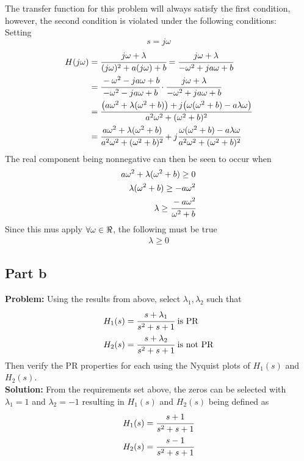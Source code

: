 \documentclass[letter]{article}
\begin{document}
The transfer function for this problem will always satisfy the first condition, however, the second condition is violated under the following conditions:\\
Setting $$s = j\omega$$
\begin{align}
	H(j\omega) &= \cfrac{j\omega + \lambda}{(j\omega)^2 + a (j\omega) + b}
	= \cfrac{j\omega + \lambda}{-\omega^2 + j a \omega + b}\\
	&= \cfrac{-\omega^2 - j a \omega + b}{-\omega^2 - j a \omega + b} \cdot \cfrac{j\omega + \lambda}{-\omega^2 + j a \omega + b}\\
	&= \cfrac{\qty(a \omega^2 + \lambda (\omega^2 + b)) + j \qty(\omega (\omega^2 + b) - a \lambda \omega)}{a^2 \omega^2 + (\omega^2 + b)^2}\\
	&= \cfrac{a \omega^2 + \lambda (\omega^2 + b)}{a^2 \omega^2 + (\omega^2 + b)^2} + j \cfrac{\omega (\omega^2 + b) - a \lambda \omega}{a^2 \omega^2 + (\omega^2 + b)^2}
\end{align}
The real component being nonnegative can then be seen to occur when
\begin{align}
	a \omega^2 + \lambda (\omega^2 + b) \geq 0\\
	\lambda (\omega^2 + b) \geq -a \omega^2\\
	\lambda \geq \cfrac{-a\omega^2}{\omega^2 + b}
\end{align}
Since this mus apply $\forall \omega \in \real$, the following must be true
\begin{align}
	\lambda \geq 0
\end{align}

\newpage
\subsection{Part b}
\textbf{Problem:}
Using the results from above, select $\lambda_1, \lambda_2$ such that
\begin{align}
	H_1(s) &= \cfrac{s+\lambda_1}{s^2 + s + 1} \text{ is PR}\\
	H_2(s) &= \cfrac{s+\lambda_2}{s^2 + s + 1} \text{ is not PR}
\end{align}
Then verify the PR properties for each using the Nyquist plots of $H_1(s)$ and $H_2(s)$.\\

\noindent
\textbf{Solution:}
From the requirements set above, the zeros can be selected with $\lambda_1 = 1$ and $\lambda_2 = -1$ resulting in $H_1(s)$ and $H_2(s)$ being defined as
\begin{align}
	H_1(s) &= \cfrac{s+1}{s^2 + s + 1}\\
	H_2(s) &= \cfrac{s-1}{s^2 + s + 1}
\end{align}
\end{document}
